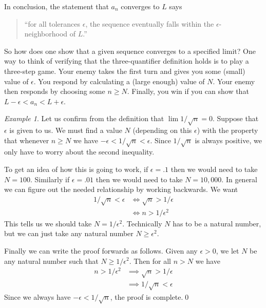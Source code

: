 \documentclass[11pt,oneside]{amsbook}
\theoremstyle{definition}
\theoremstyle{plain}
\theoremstyle{definition}
\theoremstyle{remark}
\newtheorem{example}[thm]{Example}
\numberwithin{equation}{section}
\numberwithin{figure}{section}
\begin{document}
In conclusion, the statement that $a_n$ converges to $L$ says
\begin{quotation}
 ``for all tolerances $\epsilon$, the sequence eventually falls within the $\epsilon$-neighborhood of $L$.''
\end{quotation}

So how does one show that a given sequence converges to a specified limit? One way to think of verifying that the three-quantifier definition holds is to play a three-step game. Your enemy takes the first turn and gives you some (small) value of $\epsilon$. You respond by calculating a (large enough) value of $N$. Your enemy then responds by choosing some $n\geq N$. Finally, you win if you can show that $L-\epsilon<a_n<L+\epsilon$.

\begin{example}
  Let us confirm from the definition that $\lim1/\sqrt{n}=0$. Suppose that $\epsilon$ is given to us. We must find a value $N$ (depending on this $\epsilon$) with the property that whenever $n\geq N$ we have $-\epsilon<1/\sqrt{n}<\epsilon$. Since $1/\sqrt{n}$ is always positive, we only have to worry about the second inequality.

  To get an idea of how this is going to work, if $\epsilon=.1$ then we would need to take $N=100$. Similarly if $\epsilon=.01$ then we would need to take $N=10,000$. In general we can figure out the needed relationship by working backwards. We want
  \begin{align*}
    1/\sqrt{n}<\epsilon &\iff \sqrt{n}>1/\epsilon\\
                        &\iff n>1/\epsilon^2
  \end{align*}
  This tells us we should take $N=1/\epsilon^2$. Technically $N$ has to be a natural number, but we can just take any natural number $N\geq\epsilon^2$.

  Finally we can write the proof forwards as follows. Given any $\epsilon>0$, we let $N$ be any natural number such that $N\geq1/\epsilon^2$. Then for all $n>N$ we have
  \begin{align*}
    n>1/\epsilon^2&\implies\sqrt{n}>1/\epsilon\\
                  &\implies1/\sqrt{n}<\epsilon
  \end{align*}
  Since we always have $-\epsilon<1/\sqrt{n}$, the proof is complete.\qed
\end{example}
\end{document}
